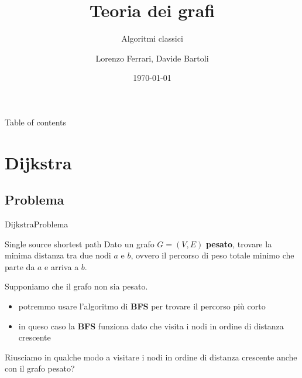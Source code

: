 \documentclass[compress]{beamer}
\title{Teoria dei grafi}
\subtitle{Algoritmi classici}
\author{Lorenzo Ferrari, Davide Bartoli}
\date{\today}
\begin{document}
\begin{frame}
  \maketitle
\end{frame}

\begin{frame}{Table of contents}
  \tableofcontents
\end{frame}

\section{Dijkstra}
\subsection{Problema}
\begin{frame}{Dijkstra}{Problema}
    \begin{exampleblock}{Single source shortest path}
        Dato un grafo $G = (V, E)$ \textbf{pesato}, trovare la minima distanza tra due nodi $a$ e $b$, ovvero il percorso 
        di peso totale minimo che parte da $a$ e arriva a $b$.
    \end{exampleblock}
    \pause
    Supponiamo che il grafo non sia pesato.
    \begin{itemize}
        \item potremmo usare l'algoritmo di \textbf{BFS} per trovare il percorso pi\`u corto
        \item in queso caso la \textbf{BFS} funziona dato che visita i nodi in ordine di distanza crescente
    \end{itemize}
    \pause
    Riusciamo in qualche modo a visitare i nodi in ordine di distanza crescente anche con il grafo pesato?
\end{frame}
\end{document}
